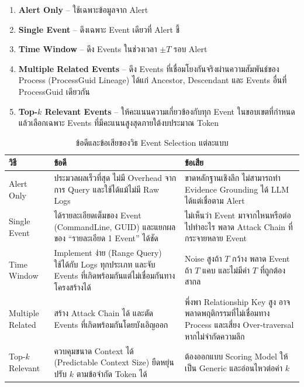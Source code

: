 \begin{enumerate}
  \item \textbf{Alert Only} -- ใช้เฉพาะข้อมูลจาก Alert
  \item \textbf{Single Event} -- ดึงเฉพาะ Event เดียวที่ Alert ชี้
  \item \textbf{Time Window} -- ดึง Events ในช่วงเวลา $\pm T$ รอบ Alert
  \item \textbf{Multiple Related Events} -- ดึง Events ที่เชื่อมโยงกันจริงผ่านความสัมพันธ์ของ Process
        (ProcessGuid Lineage) ได้แก่ Ancestor, Descendant และ Events อื่นที่ ProcessGuid เดียวกัน
  \item \textbf{Top-$k$ Relevant Events} -- ให้คะแนนความเกี่ยวข้องกับทุก Event ในขอบเขตที่กำหนด
        แล้วเลือกเฉพาะ Events ที่มีคะแนนสูงสุดภายใต้งบประมาณ Token
\end{enumerate}

\begin{table}[htbp]
  \centering
  \caption{ข้อดีและข้อเสียของวิธ Event Selection แต่ละแบบ}
  \label{tab:es-methods}
  \begin{tabular}{|L{0.16\textwidth}|L{0.36\textwidth}|L{0.36\textwidth}|}
    \hline
    \textbf{วิธี} & \textbf{ข้อดี} & \textbf{ข้อเสีย} \\ \hline
    Alert Only &
      ประมวลผลเร็วที่สุด ไม่มี Overhead จากการ Query และใช้ได้แม้ไม่มี Raw Logs &
      ขาดหลักฐานเชิงลึก ไม่สามารถทำ Evidence Grounding ได้ LLM ได้แต่เชื่อตาม Alert \\ \hline
    Single Event &
      ได้รายละเอียดเต็มของ Event (CommandLine, GUID) และแยกผลของ ``รายละเอียด 1 Event'' ได้ชัด &
      ไม่เห็นว่า Event มาจากไหนหรือต่อไปทำอะไร พลาด Attack Chain ที่กระจายหลาย Event \\ \hline
    Time Window &
      Implement ง่าย (Range Query) ใช้ได้กับ Logs ทุกประเภท และจับ Events ที่เกิดพร้อมกันแต่ไม่เชื่อมกันทางโครงสร้างได้ &
      Noise สูงถ้า $T$ กว้าง พลาด Event ถ้า $T$ แคบ และไม่มีค่า $T$ ที่ถูกต้องสากล \\ \hline
    Multiple Related &
      สร้าง Attack Chain ได้ และตัด Events ที่เกิดพร้อมกันโดยบังเอิญออก &
      พึ่งพา Relationship Key สูง อาจพลาดพฤติกรรมที่ไม่เชื่อมทาง Process และเสี่ยง Over-traversal หากไม่จำกัดความลึก \\ \hline
    Top-$k$ Relevant &
      ควบคุมขนาด Context ได้ (Predictable Context Size) ยืดหยุ่น ปรับ $k$ ตามข้อจำกัด Token ได้ &
      ต้องออกแบบ Scoring Model ให้เป็น Generic และอ่อนไหวต่อค่า $k$ \\ \hline
  \end{tabular}
\end{table}


